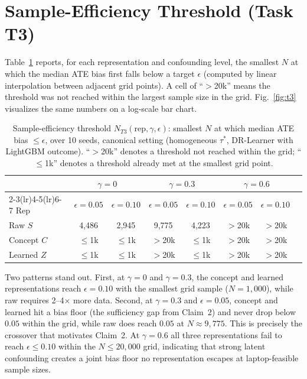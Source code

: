 \documentclass{article}
\begin{document}
\section{Sample-Efficiency Threshold (Task T3)}
\label{app:t3}
Table~\ref{tab:t3} reports, for each representation and confounding level, the
smallest $N$ at which the median ATE bias first falls below a target $\epsilon$
(computed by linear interpolation between adjacent grid points). A cell of
``$>$20k'' means the threshold was not reached within the largest sample size
in the grid. Fig.~\ref{fig:t3} visualizes the same numbers on a log-scale bar
chart.

\begin{table}[h]
\caption{Sample-efficiency threshold $N_{T3}(\text{rep}, \gamma, \epsilon)$:
smallest $N$ at which median ATE bias $\leq \epsilon$, over 10 seeds, canonical
setting (homogeneous $\tau^*$, DR-Learner with LightGBM outcome). ``$>$20k''
denotes a threshold not reached within the grid; ``$\leq$1k'' denotes a
threshold already met at the smallest grid point.}
\label{tab:t3}
\centering
\small
\begin{tabular}{lccccccc}
\toprule
 & \multicolumn{2}{c}{$\gamma=0$} & \multicolumn{2}{c}{$\gamma=0.3$} & \multicolumn{2}{c}{$\gamma=0.6$} \\
\cmidrule(lr){2-3}\cmidrule(lr){4-5}\cmidrule(lr){6-7}
Rep & $\epsilon{=}0.05$ & $\epsilon{=}0.10$ & $\epsilon{=}0.05$ & $\epsilon{=}0.10$ & $\epsilon{=}0.05$ & $\epsilon{=}0.10$ \\
\midrule
Raw $S$       & 4,486 & 2,945 & 9,775 & 4,223 & $>$20k & $>$20k \\
Concept $C$   & $\leq$1k & $\leq$1k & $>$20k & $\leq$1k & $>$20k & $>$20k \\
Learned $Z$   & $\leq$1k & $\leq$1k & $>$20k & $\leq$1k & $>$20k & $>$20k \\
\bottomrule
\end{tabular}
\end{table}

Two patterns stand out. First, at $\gamma=0$ and $\gamma=0.3$, the concept and
learned representations reach $\epsilon{=}0.10$ with the smallest grid sample
($N{=}1{,}000$), while raw requires 2--4$\times$ more data. Second, at
$\gamma=0.3$ and $\epsilon{=}0.05$, concept and learned hit a bias floor
(the sufficiency gap from Claim~2) and never drop below $0.05$ within the
grid, while raw does reach $0.05$ at $N\approx 9{,}775$. This is precisely the
crossover that motivates Claim~2. At $\gamma=0.6$ all three representations
fail to reach $\epsilon\leq 0.10$ within the $N\leq 20{,}000$ grid, indicating
that strong latent confounding creates a joint bias floor no representation
escapes at laptop-feasible sample sizes.
\end{document}
